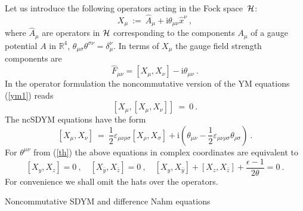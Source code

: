 \documentclass[a4paper,11pt]{article}
\makeatletter
\renewcommand{\section}{\@startsection{section}{1}{0pt}{\medskipamount}
{\medskipamount}{\large\bf}}
\numberwithin{equation}{section}
\def\th{\theta}
\def\de{\delta}
\def\e{\epsilon}
\def\ve{\varepsilon}
\def\s{\sigma}
\def\sfrac#1#2{{\textstyle\frac{#1}{#2}}}
\def\m{\mu}
\def\n{\nu}
\newcommand{\im}{\mathrm{i}}
\newcommand{\zb}{{\bar{z}}}
\newcommand{\yb}{{\bar{y}}}
\newcommand{\rc}{{\mathbb{R}^4}}
\newcommand{\Hcal}{{\cal H}}
\makeatother
\begin{document}
Let us introduce the following operators acting in the Fock space~$\Hcal$:
\begin{equation} \label{X}
X_\mu \ :=\ \hat A_\mu + \im\th_{\mu\nu} \hat x^\nu\ ,
\end{equation}
where $\hat A_\mu$ are operators in $\Hcal$ corresponding to the 
components $A_\mu$ of a
gauge potential $A$ in $\rc$, $\th_{\mu\s}\th^{\s\nu}=\de_{\mu}^{\nu}$.
In terms of $X_\mu$ the gauge field strength components are
\begin{equation} \label{ncF} 
\hat F_{\mu\nu}= [X_\mu ,X_\nu ] - \im \th_{\mu\nu}\ . 
\end{equation} 
In the operator formulation the noncommutative version of the YM equations 
(\ref{ym1}) reads
\begin{equation} \label{ncym1}
[X_\mu , [X_\mu , X_\nu ]]\ =\ 0\ .
\end{equation}
The ncSDYM equations have the form
\begin{equation} \label{ncsdym1}
[X_\mu , X_\nu ]\ =\ \sfrac{1}{2}\ve_{\mu\nu\rho\s} [X_\rho , X_\s ] + 
\im(\th_{\m\n} - \sfrac{1}{2}\ve_{\mu\nu\rho\s}\th_{\rho\s} )  \ . 
\end{equation}
For $\th^{\m\n}$ from (\ref{th}) the above equations in complex coordinates 
are equivalent to
\begin{equation} \label{ncsdym2}
[X_{y}, X_{z} ]=0\ , \quad
[X_{\yb}, X_{\zb} ]=0\ , \quad  [X_{y}, X_{\yb}]+ [X_{z}, X_{\zb} ] + \frac{\e -1}{2\th}=0\ .
\end{equation}
For convenience we shall omit the hats over the operators.

\medskip

\section{Noncommutative SDYM and difference Nahm equations}
\end{document}
